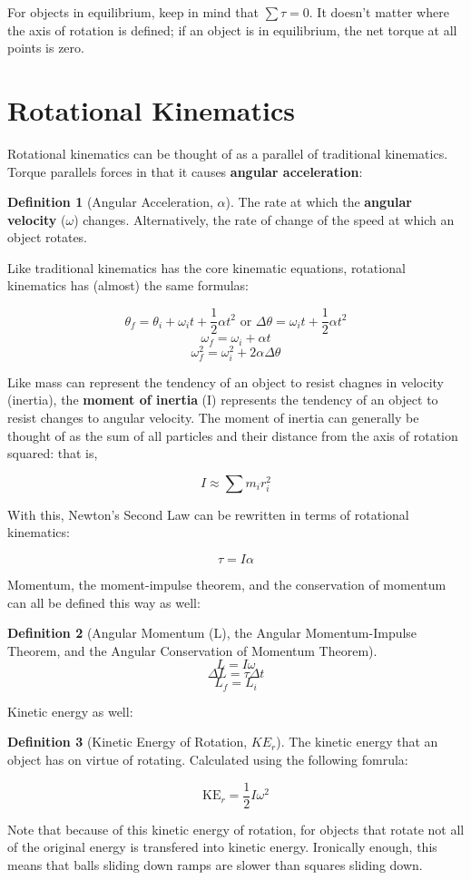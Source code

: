 \documentclass[12pt, a4paper]{article}
\theoremstyle{definition}
\newtheorem{definition}{Definition}
\begin{document}
For objects in equilibrium, keep in mind that $\sum{\tau} = 0$. It doesn't matter where the axis of rotation is defined; if an object is in equilibrium, the net torque at all points is zero.

\newpage

\section{Rotational Kinematics}

Rotational kinematics can be thought of as a parallel of traditional kinematics. Torque parallels forces in that it causes \textbf{angular acceleration}:

\begin{definition}[Angular Acceleration, $\alpha$]
    The rate at which the \textbf{angular velocity} ($\omega$) changes. Alternatively, the rate of change of the speed at which an object rotates.
\end{definition}

Like traditional kinematics has the core kinematic equations, rotational kinematics has (almost) the same formulas:

\[\theta_f = \theta_i + \omega_it + \frac{1}{2} \alpha t^2 \textrm{ or } \Delta\theta = \omega_it + \frac{1}{2} \alpha t^2\]
\[\omega_f = \omega_i + \alpha t\]
\[\omega_f^2 = \omega_i^2 + 2\alpha \Delta\theta\]

Like mass can represent the tendency of an object to resist chagnes in velocity (inertia), the \textbf{moment of inertia} (I) represents the tendency of an object to resist changes to angular velocity. The moment of inertia can generally be thought of as the sum of all particles and their distance from the axis of rotation squared: that is,

\[I \approx \sum m_i r_i^2\]

With this, Newton's Second Law can be rewritten in terms of rotational kinematics:

\[\tau = I\alpha\]

Momentum, the moment-impulse theorem, and the conservation of momentum can all be defined this way as well:

\begin{definition}[Angular Momentum (L), the Angular Momentum-Impulse Theorem, and the Angular Conservation of Momentum Theorem]
    \[L = I\omega\]
    \[\Delta L = \tau \Delta t\]
    \[L_f = L_i\]
\end{definition}

Kinetic energy as well:

\begin{definition}[Kinetic Energy of Rotation, $KE_r$]
    The kinetic energy that an object has on virtue of rotating. Calculated using the following fomrula:

    \[\textrm{KE}_r = \frac{1}{2}I\omega^2\]
\end{definition}

Note that because of this kinetic energy of rotation, for objects that rotate not all of the original energy is transfered into kinetic energy. Ironically enough, this means that balls sliding down ramps are slower than squares sliding down.
\end{document}
